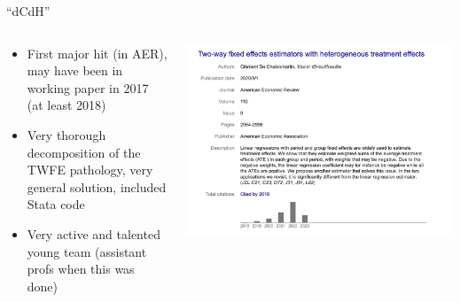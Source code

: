 \documentclass{beamer}
\begin{document}
\begin{frame}{``dCdH''}
  \begin{columns}
    \begin{column}{0.5\textwidth}
      \begin{itemize}
\item First major hit (in AER), may have been in working paper in 2017 (at least 2018)
\item Very thorough decomposition of the TWFE pathology, very general solution, included Stata code
\item Very active and talented young team (assistant profs when this was done)
      \end{itemize}
    \end{column}
    \begin{column}{0.5\textwidth}
      \includegraphics[scale=0.25]{./lecture_includes/dcdh_cites}
    \end{column}
  \end{columns}
\end{frame}
\end{document}
